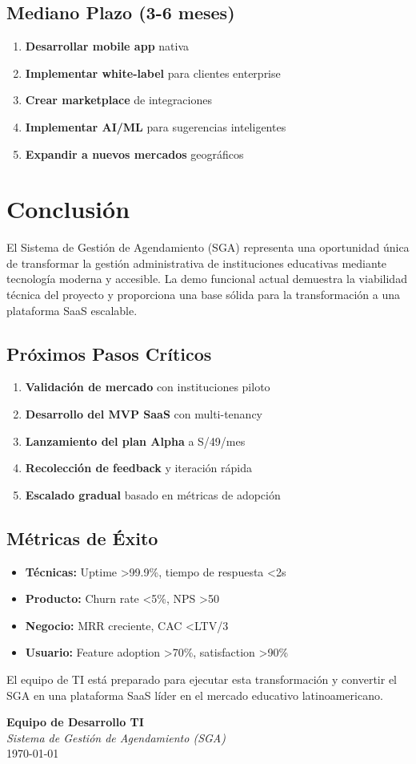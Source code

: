\documentclass[12pt,a4paper]{article}
\begin{document}
\subsection{Mediano Plazo (3-6 meses)}
\begin{enumerate}
    \item \textbf{Desarrollar mobile app} nativa
    \item \textbf{Implementar white-label} para clientes enterprise
    \item \textbf{Crear marketplace} de integraciones
    \item \textbf{Implementar AI/ML} para sugerencias inteligentes
    \item \textbf{Expandir a nuevos mercados} geográficos
\end{enumerate}

\section{Conclusión}

El Sistema de Gestión de Agendamiento (SGA) representa una oportunidad única de transformar la gestión administrativa de instituciones educativas mediante tecnología moderna y accesible. La demo funcional actual demuestra la viabilidad técnica del proyecto y proporciona una base sólida para la transformación a una plataforma SaaS escalable.

\subsection{Próximos Pasos Críticos}
\begin{enumerate}
    \item \textbf{Validación de mercado} con instituciones piloto
    \item \textbf{Desarrollo del MVP SaaS} con multi-tenancy
    \item \textbf{Lanzamiento del plan Alpha} a S/49/mes
    \item \textbf{Recolección de feedback} y iteración rápida
    \item \textbf{Escalado gradual} basado en métricas de adopción
\end{enumerate}

\subsection{Métricas de Éxito}
\begin{itemize}
    \item \textbf{Técnicas:} Uptime >99.9\%, tiempo de respuesta <2s
    \item \textbf{Producto:} Churn rate <5\%, NPS >50
    \item \textbf{Negocio:} MRR creciente, CAC <LTV/3
    \item \textbf{Usuario:} Feature adoption >70\%, satisfaction >90\%
\end{itemize}

El equipo de TI está preparado para ejecutar esta transformación y convertir el SGA en una plataforma SaaS líder en el mercado educativo latinoamericano.

\vspace{2cm}

\begin{center}
\textbf{Equipo de Desarrollo TI} \\
\textit{Sistema de Gestión de Agendamiento (SGA)} \\
\today
\end{center}
\end{document}
